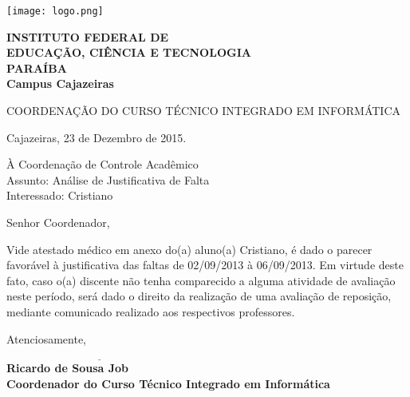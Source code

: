 


\hspace{1.4cm}
\begin{minipage}{.19\textwidth}
    \texttt{[image: logo.png]}
\end{minipage}
\begin{minipage}[t]{\textwidth}
    \vspace{.001cm}
    {\bf
        {\selectfont
            INSTITUTO FEDERAL DE\\
            EDUCAÇÃO, CIÊNCIA E TECNOLOGIA\\
            {\color{green}
                \uppercase{Paraíba}\\
                Campus Cajazeiras
            }
        }
    }
\end{minipage}

{\bf {\selectfont
    \begin{center} {\selectfont
		COORDENAÇÃO DO \uppercase{Curso Técnico Integrado em Informática}
    } \end{center}
} }

\begin{flushright} Cajazeiras, 23 de Dezembro de 2015. \end{flushright}

\noindent À Coordenação de Controle Acadêmico\\
Assunto: Análise de Justificativa de Falta\\
Interessado: Cristiano

\noindent Senhor Coordenador,

\onehalfspacing Vide atestado médico em anexo do(a) aluno(a) Cristiano, é dado o parecer favorável à justificativa das faltas de 02/09/2013 à 06/09/2013. Em virtude deste fato, caso o(a) discente não tenha comparecido a alguma atividade de avaliação neste período, será dado o direito da realização de uma avaliação de reposição, mediante comunicado realizado aos respectivos professores.

\noindent Atenciosamente,

{\bf
	\indent $\underline{\hspace{7cm}}$\\
	\indent Ricardo de Sousa Job\\
	\indent Coordenador do Curso Técnico Integrado em Informática\\
}



